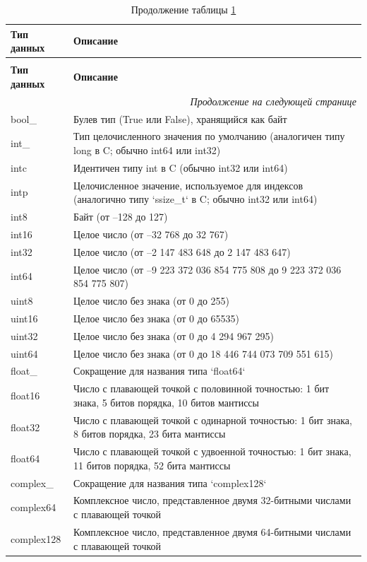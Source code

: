 \documentclass[pract]{SCWorks}
\begin{document}
\begin{longtable}{|p{2.4cm}|p{14cm}|}
\caption{Стандартные типы данных библиотеки NumPy} \label{tab:numpy-types} \\
\hline
\textbf{Тип данных} & \textbf{Описание} \\ \hline
\endfirsthead
\caption*{Продолжение таблицы \ref{tab:numpy-types}} \\
\hline
\textbf{Тип данных} & \textbf{Описание} \\ \hline
\endhead
\hline
\multicolumn{2}{r}{\textit{Продолжение на следующей странице}} \\
\endfoot
\endlastfoot

bool\_ & Булев тип (True или False), хранящийся как байт \\ \hline
int\_ & Тип целочисленного значения по умолчанию (аналогичен типу long в C; обычно int64 или int32) \\ \hline
intc & Идентичен типу int в C (обычно int32 или int64) \\ \hline
intp & Целочисленное значение, используемое для индексов (аналогично типу `ssize\_t` в C; обычно int32 или int64) \\ \hline
int8 & Байт (от –128 до 127) \\ \hline
int16 & Целое число (от –32 768 до 32 767) \\ \hline
int32 & Целое число (от –2 147 483 648 до 2 147 483 647) \\ \hline
int64 & Целое число (от –9 223 372 036 854 775 808 до 9 223 372 036 854 775 807) \\ \hline
uint8 & Целое число без знака (от 0 до 255) \\ \hline
uint16 & Целое число без знака (от 0 до 65535) \\ \hline
uint32 & Целое число без знака (от 0 до 4 294 967 295) \\ \hline
uint64 & Целое число без знака (от 0 до 18 446 744 073 709 551 615) \\ \hline
float\_ & Сокращение для названия типа `float64` \\ \hline
float16 & Число с плавающей точкой с половинной точностью: 1 бит знака, 5 битов порядка, 10 битов мантиссы \\ \hline
float32 & Число с плавающей точкой с одинарной точностью: 1 бит знака, 8 битов порядка, 23 бита мантиссы \\ \hline
float64 & Число с плавающей точкой с удвоенной точностью: 1 бит знака, 11 битов порядка, 52 бита мантиссы \\ \hline
complex\_ & Сокращение для названия типа `complex128` \\ \hline
complex64 & Комплексное число, представленное двумя 32-битными числами с плавающей точкой \\ \hline
complex128 & Комплексное число, представленное двумя 64-битными числами с плавающей точкой \\ \hline
\end{longtable}
\end{document}

